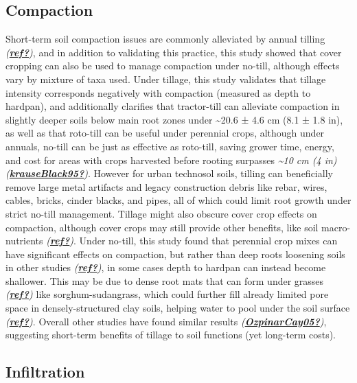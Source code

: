 \documentclass[
]{article}
\begin{document}
\hypertarget{compaction-2}{%
\subsection{Compaction}\label{compaction-2}}

Short-term soil compaction issues are commonly alleviated by annual tilling \emph{(\protect\hyperlink{ref-ref}{\textbf{ref?}})}, and in addition to validating this practice, this study showed that cover cropping can also be used to manage compaction under no-till, although effects vary by mixture of taxa used.
Under tillage, this study validates that tillage intensity corresponds negatively with compaction (measured as depth to hardpan), and additionally clarifies that tractor-till can alleviate compaction in slightly deeper soils below main root zones under
\textasciitilde20.6 ±
4.6 cm
(8.1 ±
1.8 in),
as well as that roto-till can be useful under perennial crops, although under annuals, no-till can be just as effective as roto-till, saving grower time, energy, and cost for areas with crops harvested before rooting surpasses \emph{\textasciitilde10 cm (4 in)} \emph{(\protect\hyperlink{ref-krauseBlack95}{\textbf{krauseBlack95?}})}.
However for urban technosol soils, tilling can beneficially remove large metal artifacts and legacy construction debris like rebar, wires, cables, bricks, cinder blacks, and pipes, all of which could limit root growth under strict no-till management.
Tillage might also obscure cover crop effects on compaction, although cover crops may still provide other benefits, like soil macro-nutrients \emph{(\protect\hyperlink{ref-ref}{\textbf{ref?}})}.
Under no-till, this study found that perennial crop mixes can have significant effects on compaction, but rather than deep roots loosening soils in other studies \emph{(\protect\hyperlink{ref-ref}{\textbf{ref?}})}, in some cases depth to hardpan can instead become shallower.
This may be due to dense root mats that can form under grasses \emph{(\protect\hyperlink{ref-ref}{\textbf{ref?}})} like sorghum-sudangrass, which could further fill already limited pore space in densely-structured clay soils, helping water to pool under the soil surface \emph{(\protect\hyperlink{ref-ref}{\textbf{ref?}})}.
Overall other studies have found similar results \emph{(\protect\hyperlink{ref-OzpinarCay05}{\textbf{OzpinarCay05?}})}, suggesting short-term benefits of tillage to soil functions (yet long-term costs).

\hypertarget{infiltration-2}{%
\subsection{Infiltration}\label{infiltration-2}}
\end{document}
